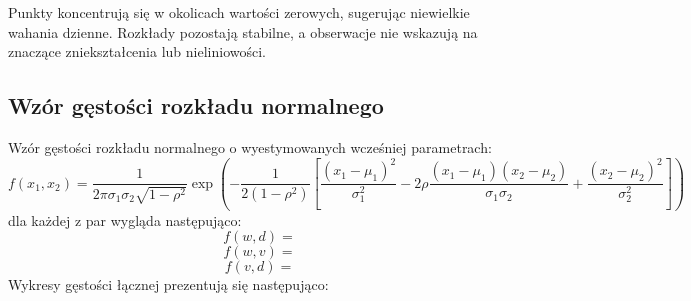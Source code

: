\documentclass[a4paper,11pt]{article}
\begin{document}
Punkty koncentrują się w okolicach wartości zerowych, sugerując niewielkie wahania dzienne. Rozkłady pozostają stabilne, a obserwacje nie wskazują na znaczące zniekształcenia lub nieliniowości.

\subsection{Wzór gęstości rozkładu normalnego}
Wzór gęstości rozkładu normalnego o wyestymowanych wcześniej parametrach:
$$f(x_1,x_2)=\frac{1}{2\pi\sigma_1\sigma_2\sqrt{1-\rho^2}}\exp\left(-\frac{1}{2(1-\rho^2)}\left[\frac{(x_1-\mu_1)^2}{\sigma_1^2}-2\rho\frac{(x_1-\mu_1)(x_2-\mu_2)}{\sigma_1\sigma_2}+\frac{(x_2-\mu_2)^2}{\sigma_2^2}\right]\right)$$
dla każdej z par wygląda następująco:
$$f(w,d)=$$
$$f(w,v)=$$
$$f(v,d)=$$
Wykresy gęstości łącznej prezentują się następująco:
\end{document}
